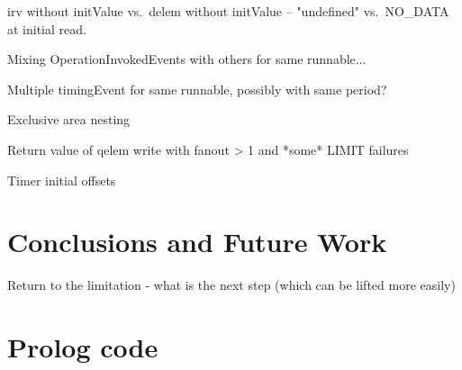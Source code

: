 \documentclass[twocolumn]{article}
\begin{document}
irv without initValue vs.\ delem without initValue -- "undefined" vs.\ NO\_DATA at initial read.

Mixing OperationInvokedEvents with others for same runnable...

Multiple timingEvent for same runnable, possibly with same period?

Exclusive area nesting

Return value of qelem write with fanout > 1 and *some* LIMIT failures

Timer initial offsets



\section{Conclusions and Future Work}
\label{sec:Conc}

Return to the limitation - what is the next step (which can be lifted more easily) 

\onecolumn
\appendix
\section{Prolog code}
\label{sec:Prolog}



\end{document}
